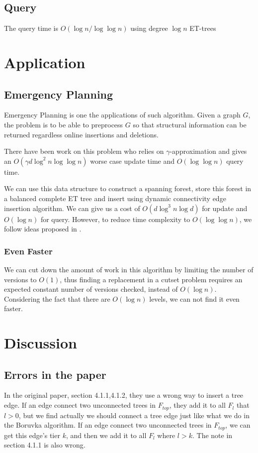 \documentclass[conference,compsoc]{IEEEtran}
\begin{document}
\subsection{Query}
The query time is $O(\log n/ \log \log n)$ using degree $\log n$ ET-trees


\section{Application}
	\subsection{Emergency Planning}
		\par Emergency Planning is one the applications of such algorithm. Given a graph $G$, the problem is to be able to preprocess $G$ so that structural information can be returned regardless online insertions and deletions.
		\par There have been work on this problem\cite{abboud2014popular} who relies on $\gamma$-approximation and gives an $O(\gamma d \log^2n\log\log n)$ worse case update time and $O(\log \log n)$ query time.
		\par We can use this data structure to construct a spanning forest, store this forest in a balanced complete ET tree and insert using dynamic connectivity edge insertion algorithm. 
		We can give us a cost of $O(d\log^3 n \log d)$ for update and $O(\log n)$ for query.
		However, to reduce time complexity to $O(\log \log n)$, we follow ideas proposed in \cite{abboud2014popular}. 
	\subsubsection{Even Faster}
		\par We can cut down the amount of work in this algorithm by limiting the number of versions to $O(1)$, thus finding a replacement in a cutset problem requires an expected constant number of versions checked, instead of $O(\log n)$. Considering the fact that there are $O(\log n)$ levels, we can not find it even faster.
\section{Discussion}
	\subsection{Errors in the paper}
	In the original paper, section 4.1.1,4.1.2, they use a wrong way to insert a tree edge. If an edge connect two unconnected trees in $F_{top}$, they add it to all $F_l$ that $l > 0$, but we find actually we should connect a tree edge just like what we do in the Boruvka algorithm. If an edge connect two unconnected trees in $F_{top}$, we can get this edge's tier $k$, and then we add it to all $F_l$ where $l > k$. The note in section 4.1.1 is also wrong.
\end{document}
